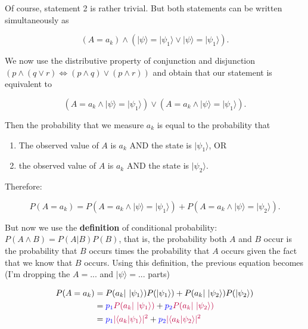 \documentclass[a4]{article}
\providecommand{\tightlist}{%
  \setlength{\itemsep}{0pt}\setlength{\parskip}{0pt}}
\begin{document}
Of course, statement 2 is rather trivial. But both statements can be
written simultaneously as

\begin{equation*} (A=a_k)\wedge(|\psi\rangle=|\psi_1\rangle \vee |\psi\rangle=|\psi_1\rangle).\end{equation*}

We now use the distributive property of conjunction and disjunction
$( p \wedge (q\vee r) \Leftrightarrow (p\wedge q)\vee (p\wedge r))$
and obtain that our statement is equivalent to

\begin{equation*} (A=a_k\wedge|\psi\rangle=|\psi_1\rangle) \vee (A=a_k\wedge|\psi\rangle=|\psi_1\rangle).\end{equation*}

Then the probability that we measure $a_k$ is equal to the probability
that

\begin{enumerate}
\def\labelenumi{\arabic{enumi}.}
\tightlist
\item
  The observed value of $A$ is $a_k$ AND the state is
  $\vert\psi_1\rangle$, OR
\item
  the observed value of $A$ is $a_k$ AND the state is
  $\vert\psi_2\rangle$.
\end{enumerate}

Therefore:

\begin{equation*}P(A=a_k) = P(A=a_k\wedge|\psi\rangle=|\psi_1\rangle) + P(A=a_k\wedge|\psi\rangle=|\psi_2\rangle).\end{equation*}

But now we use the \textbf{definition} of conditional probability:
$P(A\wedge B)=P(A|B)P(B)$, that is, the probability both $A$ and
$B$ occur is the probability that $B$ occurs times the probability
that $A$ occurs given the fact that we know that $B$ occurs. Using
this definition, the previous equation becomes (I'm dropping the
$A=...$ and $|\psi\rangle =...$ parts)

\begin{equation*}\begin{aligned}P(A=a_k) &= P(a_k\vert~|\psi_1\rangle)P(|\psi_1\rangle) + P(a_k\vert~|\psi_2\rangle)P(|\psi_2\rangle)\\ &= {\color{blue}p_1}{\color{purple}P(a_k\vert~|\psi_1\rangle)} + {\color{blue}p_2}{\color{purple}P(a_k\vert~|\psi_2\rangle)}\\
 &= {\color{blue}p_1}{\color{purple}|\langle a_k\vert\psi_1\rangle|^2} + {\color{blue}p_2}{\color{purple}|\langle a_k\vert\psi_2\rangle|^2} \end{aligned}\end{equation*}
\end{document}
